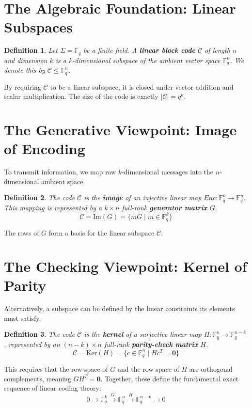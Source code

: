 \documentclass[11pt, a4paper]{article}
\newtheorem{definition}{Definition}
\newcommand{\F}{\mathbb{F}}
\newcommand{\C}{\mathcal{C}}
\begin{document}
	\section{The Algebraic Foundation: Linear Subspaces}
	
	\begin{definition}
		Let $\Sigma = \F_q$ be a finite field. A \textbf{linear block code} $\C$ of length $n$ and dimension $k$ is a $k$-dimensional subspace of the ambient vector space $\F_q^n$. We denote this by $\C \leq \F_q^n$.
	\end{definition}
	
	By requiring $\C$ to be a linear subspace, it is closed under vector addition and scalar multiplication. The size of the code is exactly $|\C| = q^k$.
	
	\section{The Generative Viewpoint: Image of Encoding}
	
	To transmit information, we map raw $k$-dimensional messages into the $n$-dimensional ambient space.
	
	\begin{definition}
		The code $\C$ is the \textbf{image} of an injective linear map $Enc: \F_q^k \to \F_q^n$. This mapping is represented by a $k \times n$ full-rank \textbf{generator matrix} $G$.
		$$ \C = \text{Im}(G) = \{ mG \mid m \in \F_q^k \} $$
	\end{definition}
	
	The rows of $G$ form a basis for the linear subspace $\C$.
	
	\section{The Checking Viewpoint: Kernel of Parity}
	
	Alternatively, a subspace can be defined by the linear constraints its elements must satisfy.
	
	\begin{definition}
		The code $\C$ is the \textbf{kernel} of a surjective linear map $H: \F_q^n \to \F_q^{n-k}$, represented by an $(n-k) \times n$ full-rank \textbf{parity-check matrix} $H$.
		$$ \C = \text{Ker}(H) = \{ c \in \F_q^n \mid Hc^T = \mathbf{0} \} $$
	\end{definition}
	
	This requires that the row space of $G$ and the row space of $H$ are orthogonal complements, meaning $GH^T = \mathbf{0}$. Together, these define the fundamental exact sequence of linear coding theory:
	$$ 0 \to \F_q^k \xrightarrow{G} \F_q^n \xrightarrow{H} \F_q^{n-k} \to 0 $$
	
\end{document}
